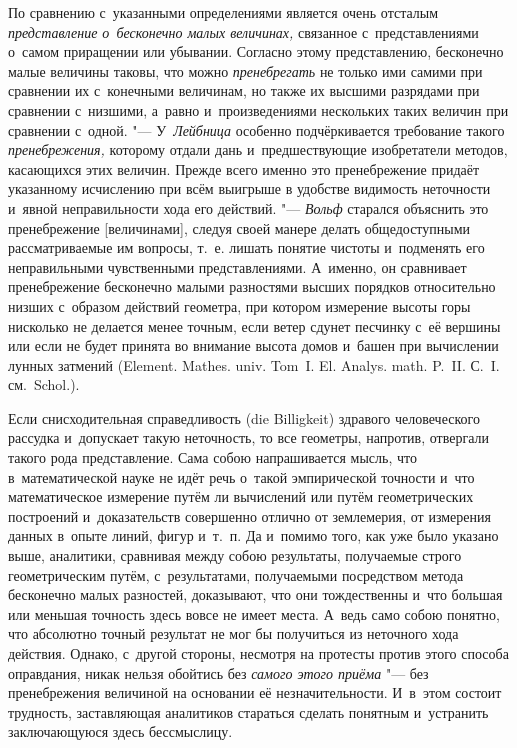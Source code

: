 По сравнению с~указанными определениями является очень отсталым
{\em представление о~бесконечно малых величинах,} связанное
с~представлениями о~самом приращении или убывании. Согласно этому представлению,
бесконечно малые величины таковы, что можно
{\em пренебрегать} не только ими самими при сравнении их с~конечными величинам, но
также их высшими разрядами при сравнении с~низшими, а~равно и~произведениями
нескольких таких величин при сравнении с~одной. "--- У~{\em Лейбница} особенно
подчёркивается требование такого {\em пренебрежения,} которому отдали
дань и~предшествующие изобретатели методов, касающихся этих величин. Прежде всего
именно это пренебрежение придаёт указанному исчислению при всём выигрыше в
удобстве видимость неточности и~явной неправильности хода его действий. "---
{\em Вольф} старался объяснить это пренебрежение [величинами], следуя своей
манере делать общедоступными рассматриваемые им вопросы, т.~е. лишать
понятие чистоты и~подменять его неправильными чувственными
представлениями. А~именно, он сравнивает пренебрежение бесконечно малыми
разностями высших порядков относительно низших с~образом действий геометра,
при котором измерение высоты горы нисколько не делается менее точным, если ветер
сдунет песчинку с~её вершины или если не будет принята во внимание высота домов и~башен при
вычислении лунных затмений (Ele\-ment. Mathes. univ. Tom~I. El. Ana\-lys.
math. P.~II. С.~I. см.~Schol.).

Если снисходительная справедливость (die Billig\-keit) здравого человеческого
рассудка и~допускает такую неточность, то все геометры, напротив, отвергали
такого рода представление. Сама собою напрашивается мысль, что в~математической
науке не идёт речь о~такой эмпирической точности и~что математическое измерение
путём ли вычислений или путём геометрических построений и~доказательств
совершенно отлично от землемерия, от измерения данных в~опыте линий, фигур
и~т.~п. Да и~помимо того, как уже было указано выше, аналитики, сравнивая между
собою результаты, получаемые строго геометрическим путём, с~результатами,
получаемыми посредством метода бесконечно малых разностей, доказывают, что они
тождественны и~что большая или меньшая точность здесь вовсе не имеет места.
А~ведь само собою понятно, что абсолютно точный результат не мог бы получиться
из неточного хода действия. Однако, с~другой стороны, несмотря на протесты
против этого способа оправдания, никак нельзя обойтись без
{\em самого этого приёма} "--- без пренебрежения величиной на основании её
незначительности. И~в~этом состоит трудность, заставляющая аналитиков стараться
сделать понятным и~устранить заключающуюся здесь бессмыслицу.

